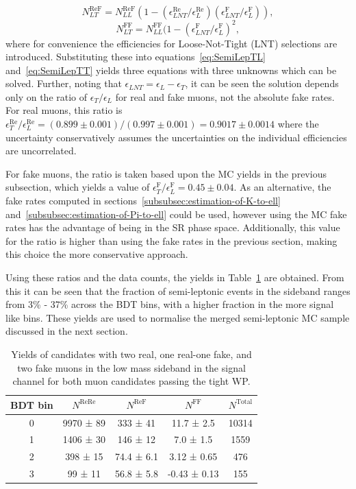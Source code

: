 \begin{equation}
  N^\text{ReF}_{LT} = N^\text{ReF}_{LL} (1-(\epsilon^{\text{Re}}_{LNT}/\epsilon^{\text{Re}}_{L}) (\epsilon^{\text{F}}_{LNT}/\epsilon^{\text{F}}_{L})),  
\end{equation}
\begin{equation}
  N^\text{FF}_{LT} = N^\text{FF}_{LL} (1-(\epsilon^{\text{F}}_{LNT}/\epsilon^{\text{F}}_{L})^{2},
\end{equation}
where for convenience the efficiencies for Loose-Not-Tight (LNT) selections are introduced. 
Substituting these into equations~\ref{eq:SemiLepTL} and~\ref{eq:SemiLepTT} yields three equations with three unknowns which can be solved. 
Further, noting that $\epsilon_{LNT} = \epsilon_{L} - \epsilon_{T}$, it can be seen the solution depends only on the ratio of $\epsilon_{T}/\epsilon_{L}$ for real and fake muons, not the absolute fake rates. 
For real muons, this ratio is $\epsilon^{\text{Re}}_{T}/\epsilon^{\text{Re}}_{L} = (0.899 \pm 0.001) /(0.997 \pm 0.001) = 0.9017 \pm 0.0014$ where the uncertainty conservatively assumes the uncertainties on the individual efficiencies are uncorrelated.   

For fake muons, the ratio is taken based upon the \Bhh MC yields in the previous subsection, which yields a value of $\epsilon^{\text{F}}_{T}/\epsilon^{\text{F}}_{L} = 0.45 \pm 0.04$. 
As an alternative, the fake rates computed in sections~\ref{subsubsec:estimation-of-K-to-ell} and~\ref{subsubsec:estimation-of-Pi-to-ell} could be used, however using the \Bhh MC fake rates has the advantage of being in the SR phase space. 
Additionally, this value for the ratio is higher than using the fake rates in the previous section, making this choice the more conservative approach. 

Using these ratios and the data counts, the yields in Table~\ref{tab:SemiLepYields} are obtained.  
From this it can be seen that the fraction of semi-leptonic events in the sideband ranges from 3\% - 37\% across the BDT bins, with a higher fraction in the more signal like bins.  
These yields are used to normalise the merged semi-leptonic MC sample discussed in the next section. 
\begin{table}[h]
  \centering
  \begin{tabular}{ccccc}
    \toprule
    BDT bin & $N^{\text{ReRe}}$ & $N^{\text{ReF}}$ & $N^{\text{FF}}$ & $N^{\text{Total}}$ \\ 
    \midrule
    0 & 9970 ± 89 & 333 ± 41 & 11.7 ± 2.5 & 10314 \\
    1 & 1406 ± 30 & 146 ± 12 & 7.0 ± 1.5 & 1559 \\
    2 & 398 ± 15 & 74.4 ± 6.1 & 3.12 ± 0.65 & 476 \\
    3 & 99 ± 11 & 56.8 ± 5.8 & -0.43 ± 0.13 & 155 \\ 
    \bottomrule
  \end{tabular}
  \caption{Yields of candidates with two real, one real-one fake, and two fake muons in the low mass sideband in the signal channel for both muon candidates passing the tight WP. }
  \label{tab:SemiLepYields}
\end{table}



